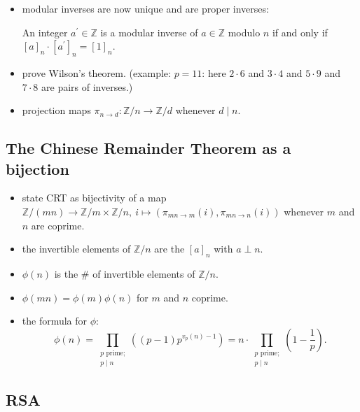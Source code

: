 \documentclass[numbers=enddot,12pt,final,onecolumn,notitlepage]{scrartcl}%
\numberwithin{exer}{subsection}
\theoremstyle{definition}
\let\prodnonlimits\prod
\renewcommand{\prod}{\prodnonlimits\limits}
\begin{document}
\begin{itemize}
\item modular inverses are now unique and are proper inverses:

An integer $a^{\prime}\in\mathbb{Z}$ is a modular inverse of $a\in\mathbb{Z}$
modulo $n$ if and only if $\left[  a\right]  _{n}\cdot\left[  a^{\prime
}\right]  _{n}=\left[  1\right]  _{n}$.

\item prove Wilson's theorem. (example: $p=11$: here $2\cdot6$ and $3\cdot4$
and $5\cdot9$ and $7\cdot8$ are pairs of inverses.)

\item projection maps $\pi_{n\rightarrow d}:\mathbb{Z}/n\rightarrow
\mathbb{Z}/d$ whenever $d\mid n$.
\end{itemize}

\subsection{The Chinese Remainder Theorem as a bijection}

\begin{itemize}
\item state CRT as bijectivity of a map $\mathbb{Z}/\left(  mn\right)
\rightarrow\mathbb{Z}/m\times\mathbb{Z}/n,\ i\mapsto\left(  \pi_{mn\rightarrow
m}\left(  i\right)  ,\pi_{mn\rightarrow n}\left(  i\right)  \right)  $
whenever $m$ and $n$ are coprime.

\item the invertible elements of $\mathbb{Z}/n$ are the $\left[  a\right]
_{n}$ with $a\perp n$.

\item $\phi\left(  n\right)  $ is the \# of invertible elements of
$\mathbb{Z}/n$.

\item $\phi\left(  mn\right)  =\phi\left(  m\right)  \phi\left(  n\right)  $
for $m$ and $n$ coprime.

\item the formula for $\phi$:%
\[
\phi\left(  n\right)  =\prod_{\substack{p\text{ prime;}\\p\mid n}}\left(
\left(  p-1\right)  p^{v_{p}\left(  n\right)  -1}\right)  =n\cdot
\prod_{\substack{p\text{ prime;}\\p\mid n}}\left(  1-\dfrac{1}{p}\right)  .
\]

\end{itemize}

\subsection{RSA}
\end{document}
